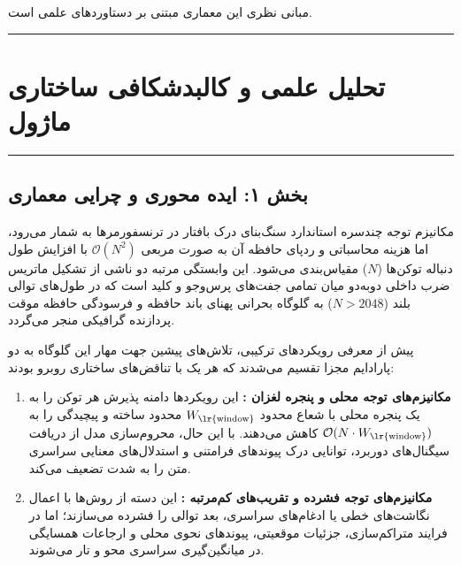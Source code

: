 \clearpage
{}
\vspace*{0.2cm}

مبانی نظری این معماری مبتنی بر دستاوردهای علمی \cite{vaswani2017attention} است.
\noindent\rule{\textwidth}{1.2pt}
\vspace*{0.1cm}
\section{تحلیل علمی و کالبدشکافی ساختاری ماژول }
\label{sec:mod_optimized_hybrid_attention}
\vspace*{-0.2cm}
\noindent\rule{\textwidth}{0.5pt}
\vspace*{0.3cm}

\subsection*{بخش ۱: ایده محوری و چرایی معماری }
مکانیزم توجه چندسره استاندارد  سنگ‌بنای درک بافتار در ترنسفورمرها به شمار می‌رود، اما هزینه محاسباتی و ردپای حافظه آن به صورت مربعی $\mathcal{O}(N^2)$ با افزایش طول دنباله توکن‌ها ($N$) مقیاس‌بندی می‌شود. این وابستگی مرتبه دو ناشی از تشکیل ماتریس ضرب داخلی دوبه‌دو میان تمامی جفت‌های پرس‌وجو و کلید است که در طول‌های توالی بلند ($N > 2048$) به گلوگاه بحرانی پهنای باند حافظه  و فرسودگی حافظه موقت پردازنده گرافیکی منجر می‌گردد.

پیش از معرفی رویکردهای ترکیبی، تلاش‌های پیشین جهت مهار این گلوگاه به دو پارادایم مجزا تقسیم می‌شدند که هر یک با تناقض‌های ساختاری روبرو بودند:
\begin{enumerate}
    \item \textbf{مکانیزم‌های توجه محلی و پنجره لغزان :} این رویکردها دامنه پذیرش هر توکن را به یک پنجره محلی با شعاع محدود $W_{\text{\lr{window}}}$ محدود ساخته و پیچیدگی را به $\mathcal{O}(N \cdot W_{\text{\lr{window}}})$ کاهش می‌دهند. با این حال، محروم‌سازی مدل از دریافت سیگنال‌های دوربرد، توانایی درک پیوندهای فرامتنی و استدلال‌های معنایی سراسری متن را به شدت تضعیف می‌کند.
    \item \textbf{مکانیزم‌های توجه فشرده و تقریب‌های کم‌مرتبه :} این دسته از روش‌ها با اعمال نگاشت‌های خطی یا ادغام‌های سراسری، بعد توالی را فشرده می‌سازند؛ اما در فرایند متراکم‌سازی، جزئیات موقعیتی، پیوندهای نحوی محلی  و ارجاعات همسایگی در میانگین‌گیری سراسری محو و تار می‌شوند.
\end{enumerate}

